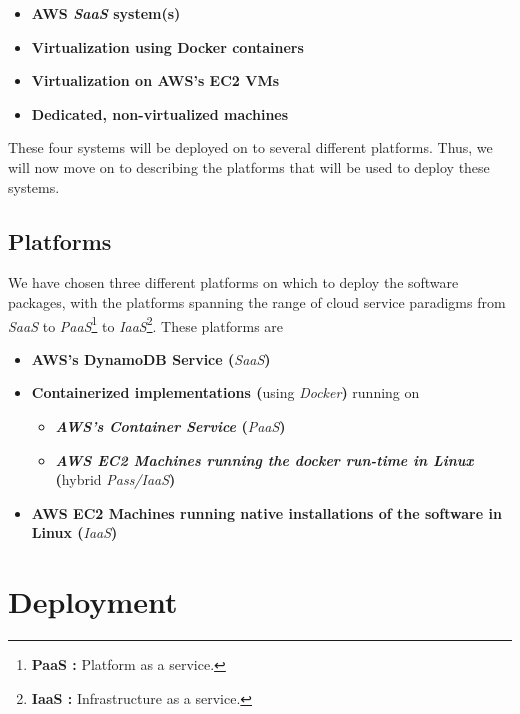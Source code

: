 \documentclass{article}[10pt]
\numberwithin{equation}{section}
\begin{document}
\begin{multicols}{2}
\begin{flushleft}
\begin{spacing}{1.5}
\begin{itemize}
	\item \textbf{AWS \emph{SaaS} system(s)}
	\item \textbf{Virtualization using Docker containers}
	\item \textbf{Virtualization on AWS's EC2 VMs}
	\item \textbf{Dedicated, non-virtualized machines}
\end{itemize}

These four systems will be deployed on to several different platforms.  Thus, we will now move on to describing the platforms that will be used to deploy these systems.
\end{spacing}




\subsection{Platforms}
\begin{spacing}{1.5}
We have chosen three different platforms on which to deploy the software packages, with the platforms spanning the range of cloud service paradigms from \emph{SaaS} to \emph{PaaS}\footnote{\textbf{PaaS :} Platform as a service.} to \emph{IaaS}\footnote{\textbf{IaaS :} Infrastructure as a service.}.  These platforms are 

\begin{itemize}
	\item \textbf{AWS's DynamoDB Service (}\emph{SaaS}\textbf{)}
	\item \textbf{Containerized implementations (}using \emph{Docker}\textbf{)} running on
	\begin{itemize}
		\item \textbf{\emph{AWS's Container Service} (}\emph{PaaS}\textbf{)}
		\item \textbf{\emph{AWS EC2 Machines running the docker run-time in Linux} (}hybrid \emph{Pass/IaaS}\textbf{)}
	\end{itemize}
	\item \textbf{AWS EC2 Machines running native installations of the software in Linux (}\emph{IaaS}\textbf{)}
\end{itemize}
\end{spacing}



\section{Deployment}




















\end{flushleft}
\end{multicols}
\end{document}
